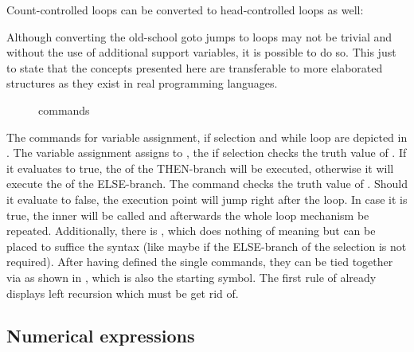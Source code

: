 Count-controlled loops can be converted to head-controlled loops as well:



Although converting the old-school goto jumps to loops may not be trivial and without the use of additional support variables, it is possible to do so. This just to state that the concepts presented here are transferable to more elaborated structures as they exist in real programming languages.

\begin{figure}
	

	\caption{commands}
	\label{fig:grammar_commands}
\end{figure}

The commands for variable assignment, if selection and while loop are depicted in . The variable assignment  assigns  to , the if selection  checks the truth value of . If it evaluates to true, the  of the THEN-branch will be executed, otherwise it will execute the  of the ELSE-branch. The  command checks the truth value of . Should it evaluate to false, the execution point will jump right after the loop. In case it is true, the inner  will be called and afterwards the whole loop mechanism be repeated. Additionally, there is , which does nothing of meaning but can be placed to suffice the syntax (like maybe if the ELSE-branch of the selection is not required). After having defined the single commands, they can be tied together via  as shown in , which is also the starting symbol. The first rule of  already displays left recursion which must be get rid of.

\begin{figure}
	\centering

	

	\caption{}
	\label{fig:grammar_prog}
\end{figure}

\subsection{Numerical expressions}

